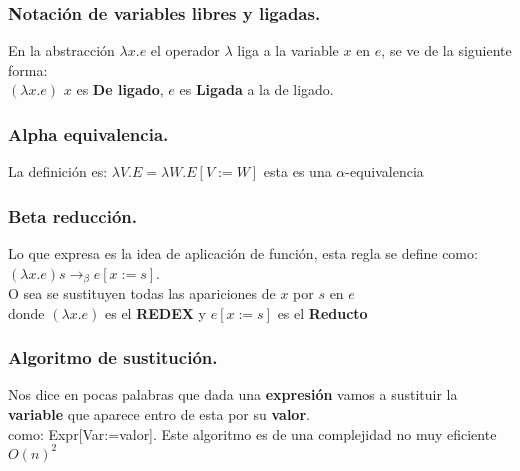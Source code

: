 \documentclass[12pt]{article}
\begin{document}
{\color{blue} \subsubsection*{Notación de variables libres y ligadas.}}
\vspace{-0.5em}

En la abstracción $\lambda x.e$  el operador $\lambda$ liga a la variable $x$ en $e$, se ve de la siguiente forma:\\
$(\lambda x.e)$ $x$ es \textbf{De ligado}, $e$ es \textbf{Ligada} a la de ligado.\\

{\color{blue} \subsubsection*{Alpha equivalencia.}}
\vspace{-0.5em}
La definición es: $\lambda V.E = \lambda W.E [V:= W]$ esta es una $\alpha$-equivalencia

{\color{blue} \subsubsection*{Beta reducción.}}
\vspace{-0.5em}
Lo que expresa es la idea de aplicación de función, esta regla se define como:\\
$(\lambda x.e)s \to_\beta e[x:=s]$.\\
O sea se sustituyen todas las apariciones de $x$ por $s$ en $e$\\ donde $(\lambda x.e)$ es el \textbf{REDEX}
y $e[x:=s]$ es el \textbf{Reducto}\\


{\color{blue} \subsubsection*{Algoritmo de sustitución.}}
\vspace{-0.5em}
Nos dice en pocas palabras que dada una \textbf{expresión} vamos a sustituir la \textbf{variable} que aparece entro de esta por su \textbf{valor}.\\
como: Expr[Var:=valor]. Este algoritmo es de una complejidad no muy eficiente $O(n)^2$\\
\end{document}
